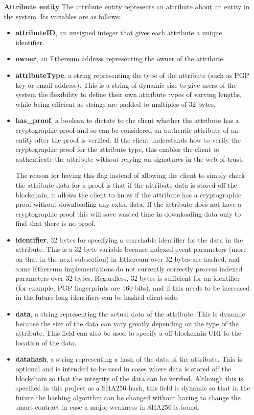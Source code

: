 \documentclass[12pt,a4paper]{report}
\begin{document}
	\bigskip
	\noindent \textbf{Attribute entity}\newline
	The attribute entity represents an attribute about an entity in the system. Its variables are as follows:
	\begin{itemize}
		\item \textbf{attributeID}, an unsigned integer that gives each attribute a unique identifier.
		\item \textbf{owner}, an Ethereum address representing the owner of the attribute.
		\item \textbf{attributeType}, a string representing the type of the attribute (such as PGP key or email address). This is a string of dynamic size to give users of the system the flexibility to define their own attribute types of varying lengths, while being efficient as strings are padded to multiples of 32 bytes\cite{14}.
		\item \textbf{has\_proof}, a boolean to dictate to the client whether the attribute has a cryptographic proof and so can be considered an authentic attribute of an entity after the proof is verified. If the client understands how to verify the cryptographic proof for the attribute type, this enables the client to authenticate the attribute without relying on signatures in the web-of-trust.
		
		The reason for having this flag instead of allowing the client to simply check the attribute data for a proof is that if the attribute data is stored off the blockchain, it allows the client to know if the attribute has a cryptographic proof without downloading any extra data. If the attribute does not have a cryptographic proof this will save wasted time in downloading data only to find that there is no proof.
		\item \textbf{identifier}, 32 bytes for specifying a searchable identifier for the data in the attribute. This is a 32 byte variable because indexed event parameters (more on that in the next subsection) in Ethereum over 32 bytes are hashed, and some Ethereum implementations do not currently correctly process indexed parameters over 32 bytes. Regardless, 32 bytes is sufficient for an identifier (for example, PGP fingerprints are 160 bits\cite{15}), and if this needs to be increased in the future long identifiers can be hashed client-side.
		\item \textbf{data}, a string representing the actual data of the attribute. This is dynamic because the size of the data can vary greatly depending on the type of the attribute. This field can also be used to specify a off-blockchain URI to the location of the data.
		\item \textbf{datahash}, a string representing a hash of the data of the attribute. This is optional and is intended to be used in cases where data is stored off the blockchain so that the integrity of the data can be verified. Although this is specified in this project as a SHA256 hash, this field is dynamic so that in the future the hashing algorithm can be changed without having to change the smart contract in case a major weakness in SHA256 is found.
	\end{itemize}
	
\end{document}

